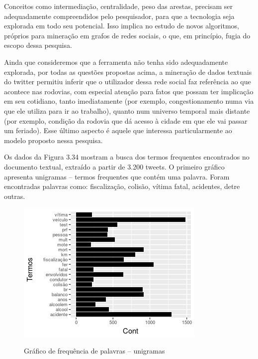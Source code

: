 Conceitos como intermediação, centralidade, peso das arestas, precisam ser adequadamente compreendidos pelo pesquisador, para que a tecnologia seja explorada em todo seu potencial. Isso implica no estudo de novos algoritmos, próprios para mineração em grafos de redes sociais, o que, em princípio, fugia do escopo dessa pesquisa.

Ainda que consideremos que a ferramenta não tenha sido adequadamente explorada, por todas as questões propostas acima, a mineração de dados textuais do twitter permitiu inferir que o utilizador dessa rede social faz referência ao que acontece nas rodovias, com especial atenção para fatos que possam ter implicação em seu cotidiano, tanto imediatamente (por exemplo, congestionamento numa via que ele utiliza para ir ao trabalho), quanto num universo temporal mais distante (por exemplo, condição da rodovia que dá acesso à cidade em que ele vai passar um feriado). Esse último aspecto é aquele que interessa particularmente ao modelo proposto nessa pesquisa.


Os dados da Figura 3.34 mostram a busca dos termos frequentes encontrados no documento textual, extraído a partir de 3.200 tweets. O primeiro gráfico apresenta unigramas -- termos frequentes que contém uma palavra. Foram encontradas palavras como: fiscalização, colisão, vítima fatal, acidentes, detre outras. 



\begin{figure}[!ht]
\centering
\caption{Gráfico de frequência de palavras -- unigramas}
\includegraphics[width=0.7\linewidth]{Figuras/Twitter/freqPalavr}
\label{fig:freqPalavras}
\end{figure}

